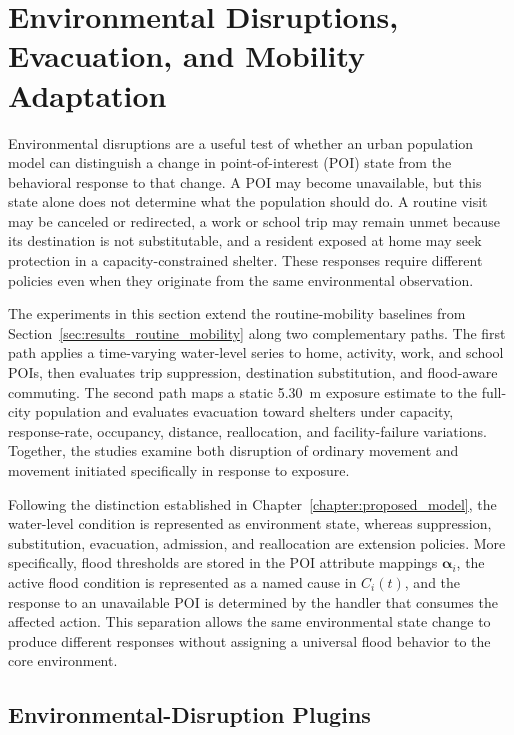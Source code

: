 \section{Environmental Disruptions, Evacuation, and Mobility Adaptation}
\label{sec:results_environment_disruptions}

Environmental disruptions are a useful test of whether an urban population model can distinguish a change in point-of-interest (POI) state from the behavioral response to that change. A POI may become unavailable, but this state alone does not determine what the population should do. A routine visit may be canceled or redirected, a work or school trip may remain unmet because its destination is not substitutable, and a resident exposed at home may seek protection in a capacity-constrained shelter. These responses require different policies even when they originate from the same environmental observation.

The experiments in this section extend the routine-mobility baselines from Section~\ref{sec:results_routine_mobility} along two complementary paths. The first path applies a time-varying water-level series to home, activity, work, and school POIs, then evaluates trip suppression, destination substitution, and flood-aware commuting. The second path maps a static 5.30~m exposure estimate to the full-city population and evaluates evacuation toward shelters under capacity, response-rate, occupancy, distance, reallocation, and facility-failure variations. Together, the studies examine both disruption of ordinary movement and movement initiated specifically in response to exposure.

Following the distinction established in Chapter~\ref{chapter:proposed_model}, the water-level condition is represented as environment state, whereas suppression, substitution, evacuation, admission, and reallocation are extension policies. More specifically, flood thresholds are stored in the POI attribute mappings $\bm{\alpha}_i$, the active flood condition is represented as a named cause in $C_i(t)$, and the response to an unavailable POI is determined by the handler that consumes the affected action. This separation allows the same environmental state change to produce different responses without assigning a universal flood behavior to the core environment.

\subsection{Environmental-Disruption Plugins}
\label{sec:environment_disruption_plugins}


